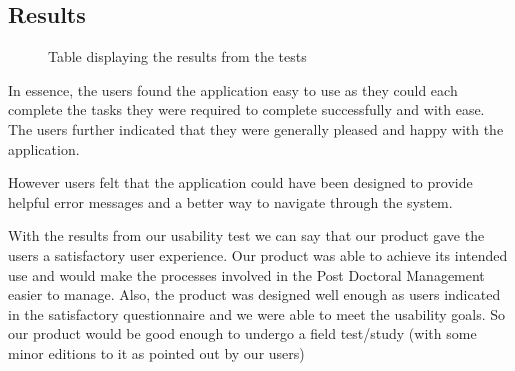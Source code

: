 \documentclass[12pt]{article}
\begin{document}
\subsection{Results}
\begin{figure}[H]
\centering	
{}
\caption{Table displaying the results from the tests}
\end{figure}

In essence, the users found the application easy to use as they could each complete the tasks they were required to complete successfully and with ease. The users further indicated that they were generally pleased and happy with the application.

However users felt that the application could have been designed to provide helpful error messages and a better way to navigate through the system.

With the results from our usability test we can say that our product gave the users a satisfactory user experience. Our product was able to achieve its intended use and would make the processes involved in the Post Doctoral Management easier to manage. Also, the product was designed well enough as users indicated in the satisfactory questionnaire and we were able to meet the usability goals. So our product would be good enough to undergo a field test/study (with some minor editions to it as pointed out by our users) 

\newpage
	
\end{document}
